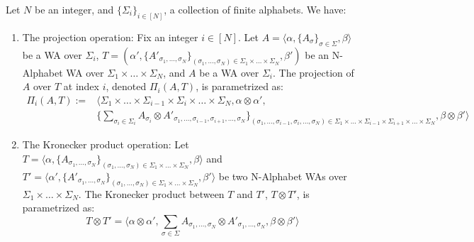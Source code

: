 \begin{proposition}
Let $N$ be an integer, and $\{\Sigma_{i}\}_{i \in [N]}$, a collection of finite alphabets. We have: 
\begin{enumerate}
 \item The projection operation: Fix an integer $i \in [N]$. Let $A = \langle \alpha, \{A_{\sigma}\}_{\sigma \in \Sigma}, \beta \rangle$ be a WA over $\Sigma_{i}$,  $T = (\alpha', \{A'_{\sigma_{1},\ldots, \sigma_{N}}\}_{(\sigma_{1}, \ldots, \sigma_{N}) \in \Sigma_{1} \times \ldots \times \Sigma_{N}}, \beta')$ be an N-Alphabet WA over $\Sigma_{1} \times \ldots \times \Sigma_{N}$, and $A$ be a WA over $\Sigma_{i}$. The projection of $A$ over $T$ at index $i$, denoted $\Pi_{i}(A,T)$, is parametrized as:
     \begin{align*}
     \Pi_{i}(A,T) :=&  \langle\Sigma_{1} \times \ldots \times \Sigma_{i-1} \times \Sigma_{i} \times \ldots \times \Sigma_{N}, \alpha \otimes \alpha' , \\
     & \{ \sum\limits_{\sigma_{i} \in \Sigma_{i}} A_{\sigma_{i}} \otimes A'_{\sigma_{1}, \ldots, \sigma_{i-1}, \sigma_{i+1}, \ldots, \sigma_{N}} \}_{(\sigma_{1}, \ldots, \sigma_{i-1},\sigma_{i}, \ldots, \sigma_{N}) \in \Sigma_{1} \times \ldots \times \Sigma_{i-1} \times \Sigma_{i+1} \times \ldots \times \Sigma_{N}} ,\beta \otimes \beta'\rangle
     \end{align*}

  \item The Kronecker product operation: Let $T = \langle\alpha, \{A_{\sigma_{1},\ldots, \sigma_{N}}\}_{(\sigma_{1}, \ldots, \sigma_{N}) \in \Sigma_{1} \times \ldots \times \Sigma_{N}}, \beta\rangle$ and $T' = \langle\alpha', \{A'_{\sigma_{1},\ldots, \sigma_{N}}\}_{(\sigma_{1}, \ldots, \sigma_{N}) \in \Sigma_{1} \times \ldots \times \Sigma_{N}}, \beta'\rangle$ be two N-Alphabet WAs over $\Sigma_{1} \times \ldots \times \Sigma_{N}$. The Kronecker product between $T$ and $T'$, $T \otimes T'$, is parametrized as:
  $$T \otimes T' = \langle\alpha \otimes \alpha', \sum\limits_{\sigma \in \Sigma} A_{\sigma_{1}, \ldots, \sigma_{N}} \otimes A'_{\sigma_{1}, \ldots, \sigma_{N}}, \beta \otimes \beta'\rangle$$
\end{enumerate}
\end{proposition}

